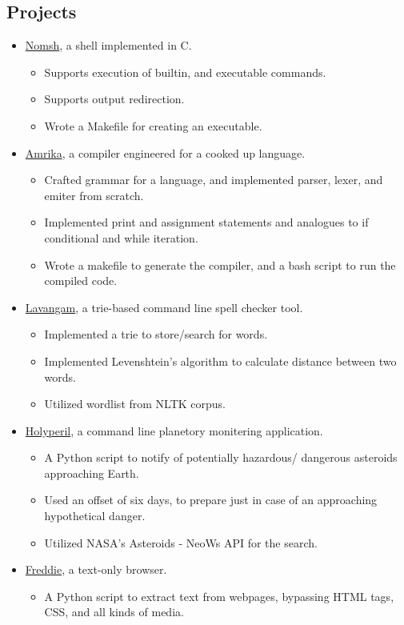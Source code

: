 \documentclass{article}
\begin{document}
\begin{multicols}{2}
\section*{Projects}
\begin{itemize}
\item \href{https://github.com/rcreddyn/nomsh}{Nomsh}, a shell implemented in C.
\begin{itemize}
\item Supports execution of builtin, and executable commands.
\item Supports output redirection.
\item Wrote a Makefile for creating an executable.
\end{itemize}
\item  \href{https://github.com/rcreddyn/nomsh}{Amrika}, a compiler engineered for a cooked up language.
\begin{itemize}
\item Crafted grammar for a language, and implemented parser, lexer, and emiter from scratch.
\item Implemented print and assignment statements and analogues to if conditional and while iteration.
\item Wrote a makefile to generate the compiler, and a bash script to run the compiled code.
\end{itemize}
\item \href{https://github.com/rcreddyn/nomsh}{Lavangam}, a trie-based command line spell checker tool.
\begin{itemize}
\item Implemented a trie to store/search for words.
\item Implemented Levenshtein's algorithm to calculate distance between two words.
\item Utilized wordlist from NLTK corpus.
\end{itemize}
\item \href{https://github.com/rcreddyn/nomsh}{Holyperil}, a command line planetory monitering application. 
\begin{itemize}
\item A Python script to notify of potentially hazardous/ dangerous asteroids approaching Earth.
\item Used an offset of six days, to prepare just in case of an approaching hypothetical danger.
\item Utilized NASA's Asteroids - NeoWs API for the search.
\end{itemize}
\item \href{https://github.com/rcreddyn/nomsh}{Freddie}, a text-only browser.
\begin{itemize}
\item A Python script to extract text from webpages, bypassing HTML tags, CSS, and all kinds of media.
\end{itemize}
\end{itemize} 
\end{multicols}
\end{document}
